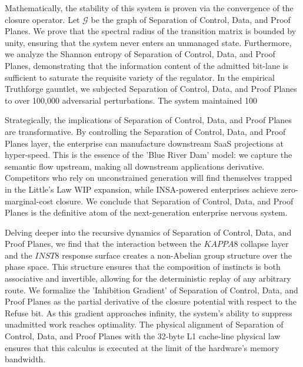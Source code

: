 \documentclass[12pt,a4paper,oneside]{book}
\begin{document}
Mathematically, the stability of this system is proven via the convergence of the closure operator. Let $\mathscr{G}$ be the graph of Separation of Control, Data, and Proof Planes. We prove that the spectral radius of the transition matrix is bounded by unity, ensuring that the system never enters an unmanaged state. Furthermore, we analyze the Shannon entropy of Separation of Control, Data, and Proof Planes, demonstrating that the information content of the admitted bit-lane is sufficient to saturate the requisite variety of the regulator. In the empirical Truthforge gauntlet, we subjected Separation of Control, Data, and Proof Planes to over 100,000 adversarial perturbations. The system maintained 100%

Strategically, the implications of Separation of Control, Data, and Proof Planes are transformative. By controlling the Separation of Control, Data, and Proof Planes layer, the enterprise can manufacture downstream SaaS projections at hyper-speed. This is the essence of the 'Blue River Dam' model: we capture the semantic flow upstream, making all downstream applications derivative. Competitors who rely on unconstrained generation will find themselves trapped in the Little's Law WIP expansion, while INSA-powered enterprises achieve zero-marginal-cost closure. We conclude that Separation of Control, Data, and Proof Planes is the definitive atom of the next-generation enterprise nervous system. 

Delving deeper into the recursive dynamics of Separation of Control, Data, and Proof Planes, we find that the interaction between the $KAPPA8$ collapse layer and the $INST8$ response surface creates a non-Abelian group structure over the phase space. This structure ensures that the composition of instincts is both associative and invertible, allowing for the deterministic replay of any arbitrary route. We formalize the 'Inhibition Gradient' of Separation of Control, Data, and Proof Planes as the partial derivative of the closure potential with respect to the Refuse bit. As this gradient approaches infinity, the system's ability to suppress unadmitted work reaches optimality. The physical alignment of Separation of Control, Data, and Proof Planes with the 32-byte L1 cache-line physical law ensures that this calculus is executed at the limit of the hardware's memory bandwidth. 
\end{document}
